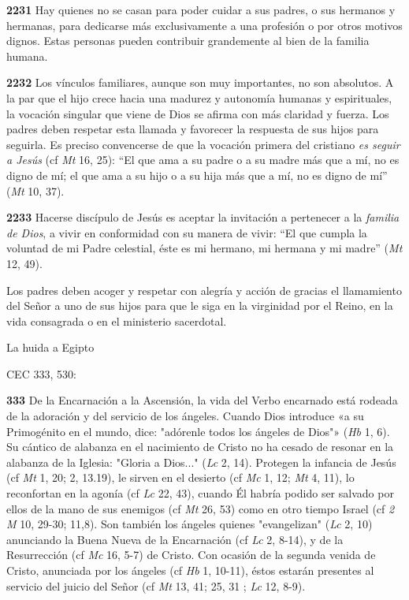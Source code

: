 \documentclass[]{article}
\begin{document}
\textbf{2231} Hay quienes no se casan para poder cuidar a sus padres, o
sus hermanos y hermanas, para dedicarse más exclusivamente a una
profesión o por otros motivos dignos. Estas personas pueden contribuir
grandemente al bien de la familia humana.

\textbf{2232} Los vínculos familiares, aunque son muy importantes, no
son absolutos. A la par que el hijo crece hacia una madurez y autonomía
humanas y espirituales, la vocación singular que viene de Dios se afirma
con más claridad y fuerza. Los padres deben respetar esta llamada y
favorecer la respuesta de sus hijos para seguirla. Es preciso
convencerse de que la vocación primera del cristiano \emph{es seguir a
Jesús} (cf \emph{Mt} 16, 25): ``El que ama a su padre o a su madre más
que a mí, no es digno de mí; el que ama a su hijo o a su hija más que a
mí, no es digno de mí'' (\emph{Mt} 10, 37).

\textbf{2233} Hacerse discípulo de Jesús es aceptar la invitación a
pertenecer a la \emph{familia de Dios}, a vivir en conformidad con su
manera de vivir: ``El que cumpla la voluntad de mi Padre celestial, éste
es mi hermano, mi hermana y mi madre'' (\emph{Mt} 12, 49).

Los padres deben acoger y respetar con alegría y acción de gracias el
llamamiento del Señor a uno de sus hijos para que le siga en la
virginidad por el Reino, en la vida consagrada o en el ministerio
sacerdotal.

La huida a Egipto

CEC 333, 530:

\textbf{333} De la Encarnación a la Ascensión, la vida del Verbo
encarnado está rodeada de la adoración y del servicio de los ángeles.
Cuando Dios introduce «a su Primogénito en el mundo, dice: "adórenle
todos los ángeles de Dios"» (\emph{Hb} 1, 6). Su cántico de alabanza en
el nacimiento de Cristo no ha cesado de resonar en la alabanza de la
Iglesia: "Gloria a Dios..." (\emph{Lc} 2, 14). Protegen la infancia de
Jesús (cf \emph{Mt} 1, 20; 2, 13.19), le sirven en el desierto (cf
\emph{Mc} 1, 12; \emph{Mt} 4, 11), lo reconfortan en la agonía (cf
\emph{Lc} 22, 43), cuando Él habría podido ser salvado por ellos de la
mano de sus enemigos (cf \emph{Mt} 26, 53) como en otro tiempo Israel
(cf \emph{2 M} 10, 29-30; 11,8). Son también los ángeles quienes
"evangelizan" (\emph{Lc} 2, 10) anunciando la Buena Nueva de la
Encarnación (cf \emph{Lc} 2, 8-14), y de la Resurrección (cf \emph{Mc}
16, 5-7) de Cristo. Con ocasión de la segunda venida de Cristo,
anunciada por los ángeles (cf \emph{Hb} 1, 10-11), éstos estarán
presentes al servicio del juicio del Señor (cf \emph{Mt} 13, 41; 25, 31
; \emph{Lc} 12, 8-9).
\end{document}
